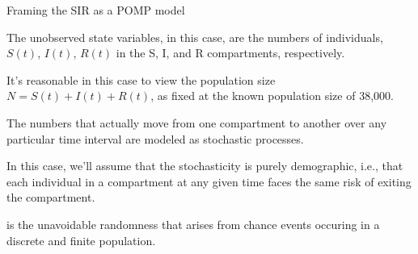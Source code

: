 \begin{frame}[fragile]{Framing the SIR as a POMP model}

  \bi

\item The unobserved state variables, in this case, are the numbers of individuals, $S(t)$, $I(t)$, $R(t)$ in the S, I, and R compartments, respectively.

\item It's reasonable in this case to view the population size $N=S(t)+I(t)+R(t)$, as fixed at the known population size of 38,000.

\item The numbers that actually move from one compartment to another over any particular time interval are modeled as stochastic processes.

\item In this case, we'll assume that the stochasticity is purely demographic, i.e., that each individual in a compartment at any given time faces the same risk of exiting the compartment.

\item {} is the unavoidable randomness that arises from chance events occuring in a discrete and finite population.

  \ei

\end{frame}

%

